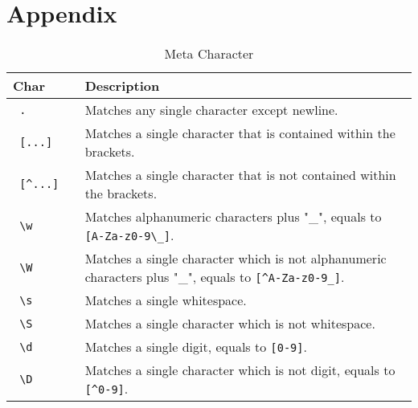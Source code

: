 \documentclass{article}
\begin{document}
\section{Appendix}

\begin{table}[ht]
\caption{Meta Character}
\centering
\begin{tabular}{l p{8cm}}
\hline\hline
Char & Description \\[0.5ex]
\hline
\verb/ .          / & Matches any single character except newline. \\
\verb/ [...]/ & Matches a single character that is contained within the brackets.\\
\verb/ [^...]/ & Matches a single character that is not contained within the brackets.\\
\verb/ \w / & Matches alphanumeric characters plus "\_", equals to \verb/[A-Za-z0-9\_]/. \\
\verb/ \W / & Matches a single character which is not alphanumeric characters plus "\_", equals to \verb/[^A-Za-z0-9_]/. \\
\verb/ \s / & Matches a single whitespace. \\
\verb/ \S / & Matches a single character which is not whitespace. \\
\verb/ \d / & Matches a single digit, equals to \verb/[0-9]/.\\
\verb/ \D / & Matches a single character which is not digit, equals to \verb/[^0-9]/.\\
\hline
\end{tabular}
\label{table:mc}
\end{table}
\end{document}
